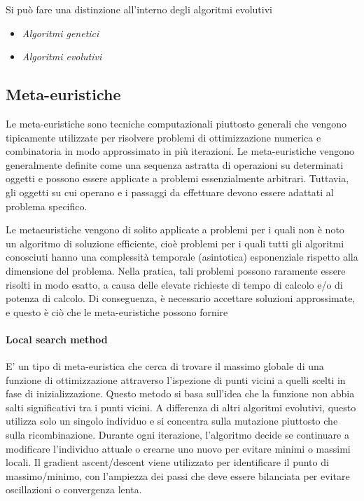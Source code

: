Si può fare una distinzione all'interno degli algoritmi evolutivi
\begin{itemize}
    \item \textit{Algoritmi genetici}
    \item \textit{Algoritmi evolutivi}
\end{itemize}


\subsection{Meta-euristiche}
Le meta-euristiche sono tecniche computazionali piuttosto generali che vengono tipicamente utilizzate per risolvere problemi di ottimizzazione numerica e combinatoria in modo approssimato in più iterazioni. Le meta-euristiche vengono generalmente definite come una sequenza astratta di operazioni su determinati oggetti e possono essere applicate a problemi essenzialmente arbitrari. Tuttavia, gli oggetti su cui operano e i passaggi da effettuare devono essere adattati al problema specifico.

Le metaeuristiche vengono di solito applicate a problemi per i quali non è noto un algoritmo di soluzione efficiente, cioè problemi per i quali tutti gli algoritmi conosciuti hanno una complessità temporale (asintotica) esponenziale rispetto alla dimensione del problema. Nella pratica, tali problemi possono raramente essere risolti in modo esatto, a causa delle elevate richieste di tempo di calcolo e/o di potenza di calcolo. Di conseguenza, è necessario accettare soluzioni approssimate, e questo è ciò che le meta-euristiche possono fornire

\paragraph{Local search method}
E' un tipo di meta-euristica che cerca di trovare il massimo globale di una funzione di ottimizzazione attraverso l'ispezione di punti vicini a quelli scelti in fase di inizializzazione. Questo metodo si basa sull'idea che la funzione non abbia salti significativi tra i punti vicini. A differenza di altri algoritmi evolutivi, questo utilizza solo un singolo individuo e si concentra sulla mutazione piuttosto che sulla ricombinazione. Durante ogni iterazione, l'algoritmo decide se continuare a modificare l'individuo attuale o crearne uno nuovo per evitare minimi o massimi locali. Il gradient ascent/descent viene utilizzato per identificare il punto di massimo/minimo, con l'ampiezza dei passi che deve essere bilanciata per evitare oscillazioni o convergenza lenta. 

